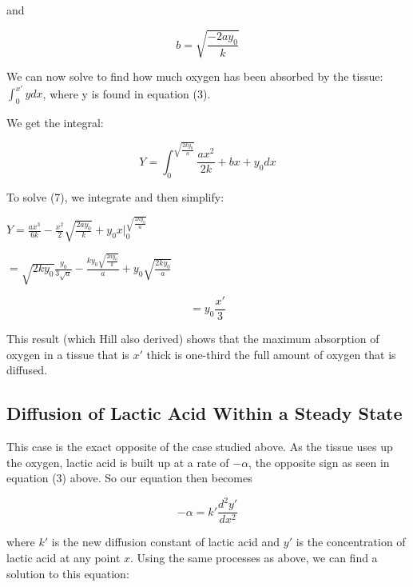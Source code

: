 \documentclass{article}
\begin{document}
and

\begin{equation}
    b = \sqrt{\frac{-2ay_0}{k}}
\end{equation}

We can now solve to find how much oxygen has been absorbed by the tissue: $ \int_{0}^{x'} y dx $, where y is found in
equation (3).

We get the integral:

\begin{equation}
    Y = \int_{0}^{\sqrt{\frac{2ky_0}{a}}} \frac{ax^2}{2k} + bx + y_0 dx
\end{equation}

To solve (7), we integrate and then simplify:

\vspace*{0.25cm}

$Y = \frac{ax^3}{6k} - \frac{x^2}{2}\sqrt{\frac{2ay_0}{k}} + y_0x \Bigg|_0^{\sqrt{\frac{2ky_0}{a}}}$
\vspace*{0.25cm}

$ = \sqrt{2ky_0} \frac{y_0}{3\sqrt{a}} - \frac{ky_0\sqrt{\frac{2ay_0}{k}}}{a} + y_0\sqrt{\frac{2ky_0}{a}}$
\vspace*{0.25cm}

\begin{equation}
    = y_0 \frac{x'}{3}
\end{equation}

This result (which Hill also derived) shows that the maximum absorption of oxygen in a tissue that is $x'$ thick
is one-third the full amount of oxygen that is diffused.

\subsection{Diffusion of Lactic Acid Within a Steady State}


This case is the exact opposite of the case studied above. As the tissue uses up the oxygen, lactic acid is built up
at a rate of $-\alpha$, the opposite sign as seen in equation (3) above. So our equation then becomes

\begin{equation}
    -\alpha = k' \frac{d^2y'}{dx^2}
    \label{eq:lactic_acid}
\end{equation}

where $k'$ is the new diffusion constant of lactic acid and $y'$ is the concentration of lactic acid at any point $x$.
Using the same processes as above, we can find a solution to this equation:
\end{document}
